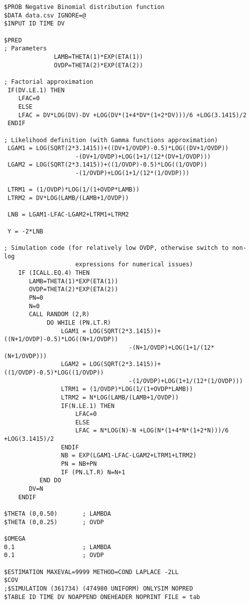 \myStartLine

\lstset{language=NONMEMdataSet}
\begin{lstlisting}
$PROB Negative Binomial distribution function 
$DATA data.csv IGNORE=@
$INPUT ID TIME DV

$PRED
; Parameters
              LAMB=THETA(1)*EXP(ETA(1))
              OVDP=THETA(2)*EXP(ETA(2))

; Factorial approximation
 IF(DV.LE.1) THEN
    LFAC=0
    ELSE
    LFAC = DV*LOG(DV)-DV +LOG(DV*(1+4*DV*(1+2*DV)))/6 +LOG(3.1415)/2
 ENDIF

; Likelihood definition (with Gamma functions approximation)
 LGAM1 = LOG(SQRT(2*3.1415))+((DV+1/OVDP)-0.5)*LOG((DV+1/OVDP)) 
                    -(DV+1/OVDP)+LOG(1+1/(12*(DV+1/OVDP)))
 LGAM2 = LOG(SQRT(2*3.1415))+((1/OVDP)-0.5)*LOG((1/OVDP))
                    -(1/OVDP)+LOG(1+1/(12*(1/OVDP)))

 LTRM1 = (1/OVDP)*LOG(1/(1+OVDP*LAMB))
 LTRM2 = DV*LOG(LAMB/(LAMB+1/OVDP))

 LNB = LGAM1-LFAC-LGAM2+LTRM1+LTRM2

 Y = -2*LNB

; Simulation code (for relatively low OVDP, otherwise switch to non-log 
					expressions for numerical issues)
    IF (ICALL.EQ.4) THEN
       LAMB=THETA(1)*EXP(ETA(1))
       OVDP=THETA(2)*EXP(ETA(2))
       PN=0
       N=0
       CALL RANDOM (2,R)
            DO WHILE (PN.LT.R)
                LGAM1 = LOG(SQRT(2*3.1415))+((N+1/OVDP)-0.5)*LOG((N+1/OVDP))
                                   -(N+1/OVDP)+LOG(1+1/(12*(N+1/OVDP)))
                LGAM2 = LOG(SQRT(2*3.1415))+((1/OVDP)-0.5)*LOG((1/OVDP))
                                   -(1/OVDP)+LOG(1+1/(12*(1/OVDP)))
                LTRM1 = (1/OVDP)*LOG(1/(1+OVDP*LAMB))
                LTRM2 = N*LOG(LAMB/(LAMB+1/OVDP))
                IF(N.LE.1) THEN
                    LFAC=0
                    ELSE
                    LFAC = N*LOG(N)-N +LOG(N*(1+4*N*(1+2*N)))/6 +LOG(3.1415)/2
                ENDIF
                NB = EXP(LGAM1-LFAC-LGAM2+LTRM1+LTRM2)
                PN = NB+PN
                IF (PN.LT.R) N=N+1
          END DO
       DV=N
    ENDIF

$THETA (0,0.50)       ; LAMBDA
$THETA (0,0.25)       ; OVDP

$OMEGA
0.1                   ; LAMBDA
0.1                   ; OVDP

$ESTIMATION MAXEVAL=9999 METHOD=COND LAPLACE -2LL
$COV
;$SIMULATION (361734) (474980 UNIFORM) ONLYSIM NOPRED
$TABLE ID TIME DV NOAPPEND ONEHEADER NOPRINT FILE = tab
\end{lstlisting}

